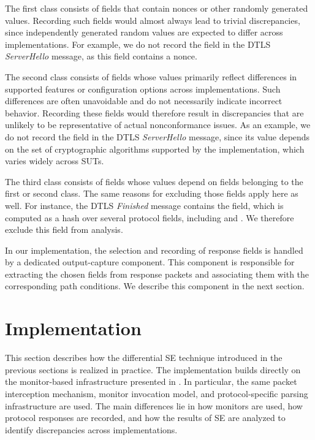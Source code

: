 The first class consists of fields that contain nonces or other randomly generated values.
Recording such fields would almost always lead to trivial discrepancies, since independently generated random values are expected to differ across implementations.
For example, we do not record the  field in the DTLS \emph{ServerHello} message, as this field contains a nonce.

The second class consists of fields whose values primarily reflect differences in supported features or configuration options across implementations.
Such differences are often unavoidable and do not necessarily indicate incorrect behavior.
Recording these fields would therefore result in discrepancies that are unlikely to be representative of actual nonconformance issues.
As an example, we do not record the  field in the DTLS \emph{ServerHello} message, since its value depends on the set of cryptographic algorithms supported by the implementation, which varies widely across SUTs.

The third class consists of fields whose values depend on fields belonging to the first or second class.
The same reasons for excluding those fields apply here as well.
For instance, the DTLS \emph{Finished} message contains the  field, which is computed as a hash over several protocol fields, including  and .
We therefore exclude this field from analysis.

In our implementation, the selection and recording of response fields is handled by a dedicated output-capture component.
This component is responsible for extracting the chosen fields from response packets and associating them with the corresponding path conditions.
We describe this component in the next section.
\section{Implementation}
This section describes how the differential SE technique introduced in the previous sections is realized in practice.
The implementation builds directly on the monitor-based infrastructure presented in .
In particular, the same packet interception mechanism, monitor invocation model, and protocol-specific parsing infrastructure are used.
The main differences lie in how monitors are used, how protocol responses are recorded, and how the results of SE are analyzed to identify discrepancies across implementations.

